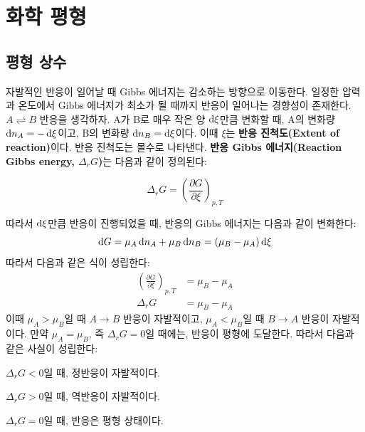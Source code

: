 \chapter{화학 평형}
        \section{평형 상수}
        \hspace{\parindent} 자발적인 반응이 일어날 때 Gibbs 에너지는 감소하는 방향으로 이동한다. 일정한 압력과 온도에서 Gibbs 
        에너지가 최소가 될 때까지 반응이 일어나는 경향성이 존재한다. $A\rightleftharpoons B$ 반응을 생각하자. A가 B로 매우 작은 
        양 $\operatorname{d\!} \xi$만큼 변화할 때, A의 변화량 $\operatorname{d\!} n_A = -\operatorname{d\!} \xi$이고, B의 변화량 
        $\operatorname{d\!} n_B = \operatorname{d\!} \xi$이다. 이때 $\xi$는 \textbf{반응 진척도(Extent of reaction)}이다. 반응 
        진척도는 몰수로 나타낸다. \textbf{반응 Gibbs 에너지(Reaction Gibbs energy, $\Delta_r G$)}는 다음과 같이 정의된다:
        \begin{defn}\label{rxngibbs}
        \begin{equation*}
            \Delta_r G=\left(\frac{\partial G}{\partial \xi}\right)_{p,T}
        \end{equation*}
        \end{defn}
        따라서 $\operatorname{d\!} \xi$만큼 반응이 진행되었을 때, 반응의 Gibbs 에너지는 다음과 같이 변화한다:
        \begin{equation*}
            \operatorname{d\!} G =\mu_A \operatorname{d\!} n_A + \mu_B \operatorname{d\!} n_B = \left(\mu_B-\mu_A\right)\operatorname{d\!} \xi
        \end{equation*}
        따라서 다음과 같은 식이 성립한다:
        \begin{equation*}
            \begin{aligned}
                \left(\frac{\partial G}{\partial \xi}\right)_{p,T} &= \mu_B-\mu_A \\
                \Delta_r G &= \mu_B - \mu_A
            \end{aligned}
        \end{equation*}
        이때 $\mu_A > \mu_B$일 때 $A\rightarrow B$ 반응이 자발적이고, $\mu_A < \mu_B$일 때 $B \rightarrow A$ 반응이 자발적이다. 
        만약 $\mu_A = \mu_B$, 즉 $\Delta_r G =0$일 때에는, 반응이 평형에 도달한다. 따라서 다음과 같은 사실이 성립한다:
        \begin{enum}
            \item $\Delta_r G<0$일 때, 정반응이 자발적이다.
            \item $\Delta_r G>0$일 때, 역반응이 자발적이다.
            \item $\Delta_r G=0$일 때, 반응은 평형 상태이다.
        \end{enum}
